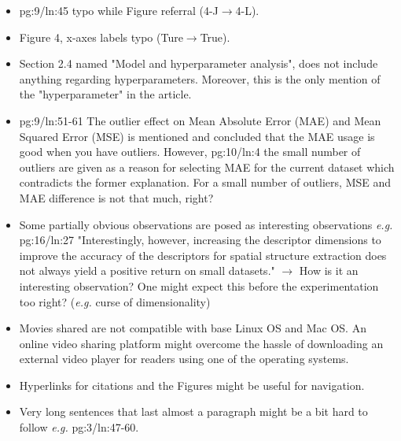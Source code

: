 \documentclass[a4paper,9pt]{article}
\begin{document}
\begin{itemize}
  \item pg:9/ln:45 typo while Figure referral (4-J$\to$4-L).
  \item Figure 4, x-axes labels typo (Ture$\to$True).
  \item Section 2.4 named "Model and hyperparameter analysis", does not include anything regarding hyperparameters. Moreover, this is the only mention of the "hyperparameter" in the article.
  \item pg:9/ln:51-61 The outlier effect on Mean Absolute Error (MAE) and Mean Squared Error (MSE) is mentioned and concluded that the MAE usage is good when you have outliers. However, pg:10/ln:4 the small number of outliers are given as a reason for selecting MAE for the current dataset which contradicts the former explanation. For a small number of outliers, MSE and MAE difference is not that much, right? 
  \item Some partially obvious observations are posed as interesting observations \textit{e.g.} pg:16/ln:27 "Interestingly, however, increasing the descriptor dimensions to improve the accuracy of the descriptors for spatial structure extraction does not always yield a positive return on small datasets." $\to$ How is it an interesting observation? One might expect this before the experimentation too right? (\textit{e.g.} curse of dimensionality)
  \item Movies shared are not compatible with base Linux OS and Mac OS. An online video sharing platform might overcome the hassle of downloading an external video player for readers using one of the operating systems.
  \item Hyperlinks for citations and the Figures might be useful for navigation.
  \item Very long sentences that last almost a paragraph might be a bit hard to follow \textit{e.g.} pg:3/ln:47-60.
\end{itemize}
\end{document}
